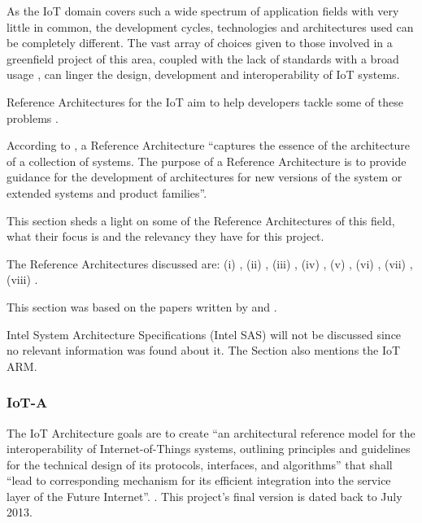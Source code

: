 As the \gls{IoT} domain covers such a wide spectrum of application fields with very little in common, the development cycles, technologies and architectures used can be completely different. The vast array of choices given to those involved in a greenfield project of this area, coupled with the lack of standards with a broad usage \parencite{DIAS2022100529, weyrich2015reference}, can linger the design, development and interoperability of \gls{IoT} systems.

Reference Architectures for the \gls{IoT} aim to help developers tackle some of these problems \parencite{weyrich2015reference}.

According to \cite{muller2008reference}, a Reference Architecture ``captures the essence of the architecture of a collection of systems. The purpose of a Reference Architecture is to provide guidance for the development of architectures for new versions of the system or extended systems and product families''.

This section sheds a light on some of the Reference Architectures of this field, what their focus is and the relevancy they have for this project.

The Reference Architectures discussed are: (i) , (ii) , (iii) , (iv) , (v) , (vi) , (vii) , (viii) .

This section was based on the papers written by \cite{Lynn2020} and \cite{DIAS2022100529}.

Intel System Architecture Specifications (Intel SAS) will not be discussed since no relevant information was found about it.
The  Section also mentions the \gls{IoT} \gls{ARM}.

\subsubsection{IoT-A}
\label{subsubsec:stateofart:arch:iota}

The IoT Architecture goals are to create ``an architectural reference model for the interoperability of Internet-of-Things systems, outlining principles and guidelines for the technical design of its protocols, interfaces, and algorithms'' that shall ``lead to corresponding mechanism for its efficient integration into the service layer of the Future Internet''. \parencite{iot-a}. This project's final version is dated back to July 2013.

